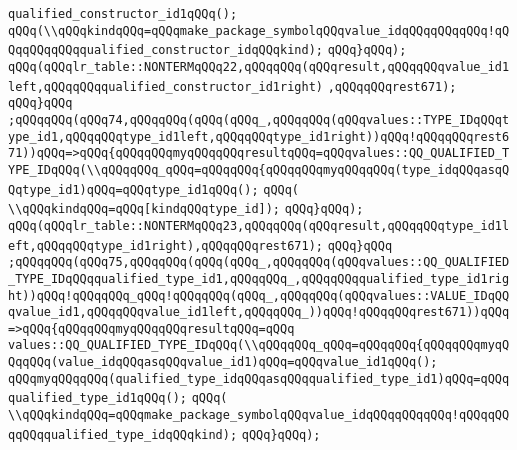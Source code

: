 \verb|qualified_constructor_id1qQQq();|\newline
\verb|qQQq(\\qQQqkindqQQq=qQQqmake_package_symbolqQQqvalue_idqQQqqQQqqQQq!qQQqqQQqqQQqqualified_constructor_idqQQqkind);|\newline
\verb|qQQq}qQQq);|\newline
\verb|qQQq(qQQqlr_table::NONTERMqQQq22,qQQqqQQq(qQQqresult,qQQqqQQqvalue_id1left,qQQqqQQqqualified_constructor_id1right)|\newline
\verb|,qQQqqQQqrest671);|\newline
\verb|qQQq}qQQq|\newline
\verb|;qQQqqQQq(qQQq74,qQQqqQQq(qQQq(qQQq_,qQQqqQQq(qQQqvalues::TYPE_IDqQQqtype_id1,qQQqqQQqtype_id1left,qQQqqQQqtype_id1right))qQQq!qQQqqQQqrest671))qQQq=>qQQq{qQQqqQQqmyqQQqqQQqresultqQQq=qQQqvalues::QQ_QUALIFIED_TYPE_IDqQQq(\\qQQqqQQq_qQQq=qQQqqQQq{qQQqqQQqmyqQQqqQQq(type_idqQQqasqQQqtype_id1)qQQq=qQQqtype_id1qQQq();|\newline
\verb|qQQq(|\newline
\verb|\\qQQqkindqQQq=qQQq[kindqQQqtype_id]);|\newline
\verb|qQQq}qQQq);|\newline
\verb|qQQq(qQQqlr_table::NONTERMqQQq23,qQQqqQQq(qQQqresult,qQQqqQQqtype_id1left,qQQqqQQqtype_id1right),qQQqqQQqrest671);|\newline
\verb|qQQq}qQQq|\newline
\verb|;qQQqqQQq(qQQq75,qQQqqQQq(qQQq(qQQq_,qQQqqQQq(qQQqvalues::QQ_QUALIFIED_TYPE_IDqQQqqualified_type_id1,qQQqqQQq_,qQQqqQQqqualified_type_id1right))qQQq!qQQqqQQq_qQQq!qQQqqQQq(qQQq_,qQQqqQQq(qQQqvalues::VALUE_IDqQQqvalue_id1,qQQqqQQqvalue_id1left,qQQqqQQq_))qQQq!qQQqqQQqrest671))qQQq=>qQQq{qQQqqQQqmyqQQqqQQqresultqQQq=qQQq|\newline
\verb|values::QQ_QUALIFIED_TYPE_IDqQQq(\\qQQqqQQq_qQQq=qQQqqQQq{qQQqqQQqmyqQQqqQQq(value_idqQQqasqQQqvalue_id1)qQQq=qQQqvalue_id1qQQq();|\newline
\verb|qQQqmyqQQqqQQq(qualified_type_idqQQqasqQQqqualified_type_id1)qQQq=qQQqqualified_type_id1qQQq();|\newline
\verb|qQQq(|\newline
\verb|\\qQQqkindqQQq=qQQqmake_package_symbolqQQqvalue_idqQQqqQQqqQQq!qQQqqQQqqQQqqualified_type_idqQQqkind);|\newline
\verb|qQQq}qQQq);|\newline
